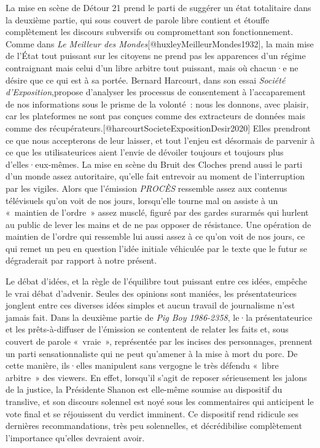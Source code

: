 \documentclass[
]{article}
\begin{document}
La mise en scène de Détour 21 prend le parti de suggérer un état totalitaire dans la deuxième partie, qui sous couvert de parole libre contient et étouffe complètement les discours subversifs ou compromettant son fonctionnement. Comme dans \emph{Le Meilleur des Mondes}{[}@huxleyMeilleurMondes1932{]}, la main mise de l'État tout puissant sur les citoyens ne prend pas les apparences d'un régime contraignant mais celui d'un libre arbitre tout puissant, mais où chacun·e ne désire que ce qui est à sa portée. Bernard Harcourt, dans son essai \emph{Société d'Exposition},propose d'analyser les processus de consentement à l'accaparement de nos informations sous le prisme de la volonté~: nous les donnons, avec plaisir, car les plateformes ne sont pas conçues comme des extracteurs de données mais comme des récupérateurs.{[}@harcourtSocieteExpositionDesir2020{]} Elles prendront ce que nous accepterons de leur laisser, et tout l'enjeu est désormais de parvenir à ce que les utilisateurices aient l'envie de dévoiler toujours et toujours plus d'elles·eux-mêmes. La mise en scène du Bruit des Cloches prend aussi le parti d'un monde assez autoritaire, qu'elle fait entrevoir au moment de l'interruption par les vigiles. Alors que l'émission \emph{PROCÈS} ressemble assez aux contenus télévisuels qu'on voit de nos jours, lorsqu'elle tourne mal on assiste à un «~maintien de l'ordre~» assez musclé, figuré par des gardes surarmés qui hurlent au public de lever les mains et de ne pas opposer de résistance. Une opération de maintien de l'ordre qui ressemble lui aussi assez à ce qu'on voit de nos jours, ce qui remet un peu en question l'idée initiale véhiculée par le texte que le futur se dégraderait par rapport à notre présent.

Le débat d'idées, et la règle de l'équilibre tout puissant entre ces idées, empêche le vrai débat d'advenir. Seules des opinions sont maniées, les présentateurices jonglent entre ces diverses idées simples et aucun travail de journalisme n'est jamais fait. Dans la deuxième partie de \emph{Pig Boy 1986-2358}, le·la présentateurice et les prêts-à-diffuser de l'émission se contentent de relater les faits et, sous couvert de parole «~vraie~», représentée par les incises des personnages, prennent un parti sensationnaliste qui ne peut qu'amener à la mise à mort du porc. De cette manière, ils·elles manipulent sans vergogne le très défendu «~libre arbitre~» des viewers. En effet, lorsqu'il s'agit de reposer sérieusement les jalons de la justice, la Présidente Shanon est elle-même soumise au dispositif du translive, et son discours solennel est noyé sous les commentaires qui anticipent le vote final et se réjouissent du verdict imminent. Ce dispositif rend ridicule ses dernières recommandations, très peu solennelles, et décrédibilise complètement l'importance qu'elles devraient avoir.
\end{document}
